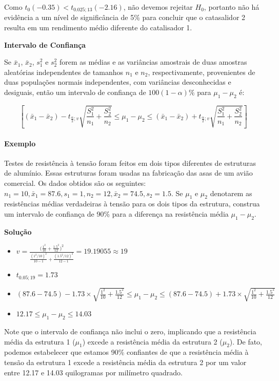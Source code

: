 \documentclass[
]{book}
\providecommand{\tightlist}{%
  \setlength{\itemsep}{0pt}\setlength{\parskip}{0pt}}
\begin{document}
Como \(t_0(-0.35)<t_{0.025;13}(-2.16)\), não devemos rejeitar \(H_0\), portanto não há evidência a um nível de significância de 5\% para concluir que o catasalidor 2 resulta em um rendimento médio diferente do catalisador 1.

\textbf{Intervalo de Confiança}

Se \(\bar x_1\), \(\bar x_2\), \(s_1^2\) e \(s_2^2\) forem as médias e as variâncias amostrais de duas amostras aleatórias independentes de tamanhos \(n_1\) e \(n_2\), respectivamente, provenientes de duas populações normais independentes, com variâncias desconhecidas e desiguais, então um intervalo de confiança de \(100(1-\alpha)\%\) para \(\mu_1-\mu_2\) é:

\[\left[(\bar x_1-\bar x_2) -t_{\frac{\alpha}{2};v}\sqrt{\frac{S_1^2}{n_1}+\frac{S_2^2}{n_2}}\leq \mu_1-\mu_2 \leq (\bar x_1-\bar x_2) +t_{\frac{\alpha}{2};v}\sqrt{\frac{S_1^2}{n_1}+\frac{S_2^2}{n_2}}\right]\]

\hypertarget{exemplo-14}{%
\paragraph{Exemplo}\label{exemplo-14}}

Testes de resistência à tensão foram feitos em dois tipos diferentes de estruturas de alumínio. Essas estruturas foram usadas na fabricação das asas de um avião comercial. Os dados obtidos são os seguintes: \(n_1=10, \bar x_1=87.6, s_1=1, n_2=12, \bar x_2=74.5, s_2=1.5\). Se \(\mu_1\) e \(\mu_2\) denotarem as resistências médias verdadeiras à tensão para os dois tipos da estrutura, construa um intervalo de confiança de 90\% para a diferença na resistência média \(\mu_1-\mu_2\).

\textbf{Solução}

\begin{itemize}
\tightlist
\item
  \(v=\frac{\Big(\frac{1^2}{10}+\frac{1.5^2}{12}\Big)^2}{\frac{(1^2/10)^2}{10-1}+\frac{(1.5^2/12)^2}{12-1}}=19.19055\approx19\)
\item
  \(t_{0.05;19}=1.73\)
\item
  \((87.6-74.5) -1.73\times \sqrt{\frac{1^2}{10}+\frac{1.5^2}{12}}\leq \mu_1-\mu_2 \leq (87.6-74.5) +1.73\times \sqrt{\frac{1^2}{10}+\frac{1.5^2}{12}}\)
\item
  \(12.17 \leq \mu_1-\mu_2 \leq 14.03\)
\end{itemize}

Note que o intervalo de confiança não inclui o zero, implicando que a resistência média da estrutura 1 (\(\mu_1\)) excede a resistência média da estrutura 2 (\(\mu_2\)). De fato, podemos estabelecer que estamos 90\% confiantes de que a resistência média à tensão da estrutura 1 excede a resistência média da estrutura 2 por um valor entre 12.17 e 14.03 quilogramas por milímetro quadrado.
\end{document}
